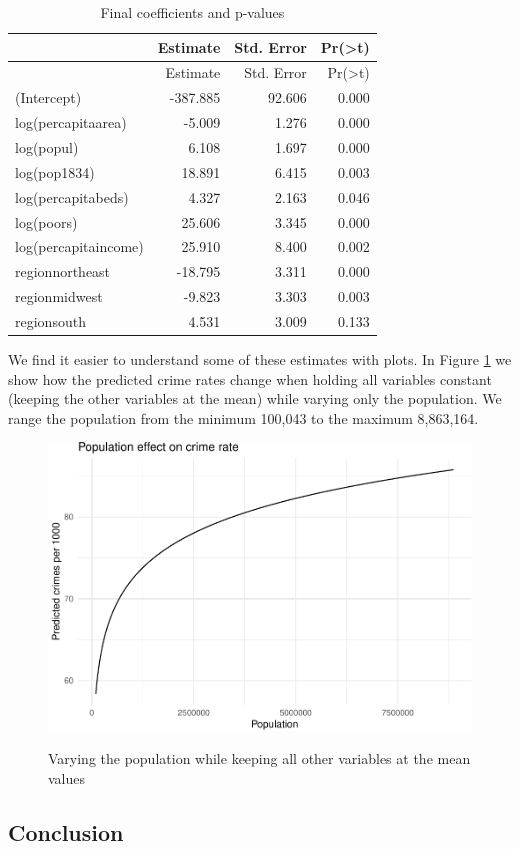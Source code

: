 \documentclass[]{article}
\begin{document}
\begin{longtable}[]{@{}lrrr@{}}
\caption{Final coefficients and p-values}\tabularnewline
\toprule
& Estimate & Std. Error &
Pr(\textgreater{}\textbar{}t\textbar{})\tabularnewline
\midrule
\endfirsthead
\toprule
& Estimate & Std. Error &
Pr(\textgreater{}\textbar{}t\textbar{})\tabularnewline
\midrule
\endhead
(Intercept) & -387.885 & 92.606 & 0.000\tabularnewline
log(percapitaarea) & -5.009 & 1.276 & 0.000\tabularnewline
log(popul) & 6.108 & 1.697 & 0.000\tabularnewline
log(pop1834) & 18.891 & 6.415 & 0.003\tabularnewline
log(percapitabeds) & 4.327 & 2.163 & 0.046\tabularnewline
log(poors) & 25.606 & 3.345 & 0.000\tabularnewline
log(percapitaincome) & 25.910 & 8.400 & 0.002\tabularnewline
regionnortheast & -18.795 & 3.311 & 0.000\tabularnewline
regionmidwest & -9.823 & 3.303 & 0.003\tabularnewline
regionsouth & 4.531 & 3.009 & 0.133\tabularnewline
\bottomrule
\end{longtable}

We find it easier to understand some of these estimates with plots.
In Figure \ref{fig:vary_popul} we show how the predicted crime rates change when holding all variables constant (keeping the other variables at the mean) while varying only the population. We range the
population from the minimum 100,043 to the maximum 8,863,164.

\begin{figure}[h!]
\caption{Varying the population while keeping all other variables at the mean values}
\includegraphics{project_files/figure-latex/unnamed-chunk-18-1.pdf}
\centering
\label{fig:vary_popul}
\end{figure}


\subsection{Conclusion}\label{conclusion}
\end{document}
